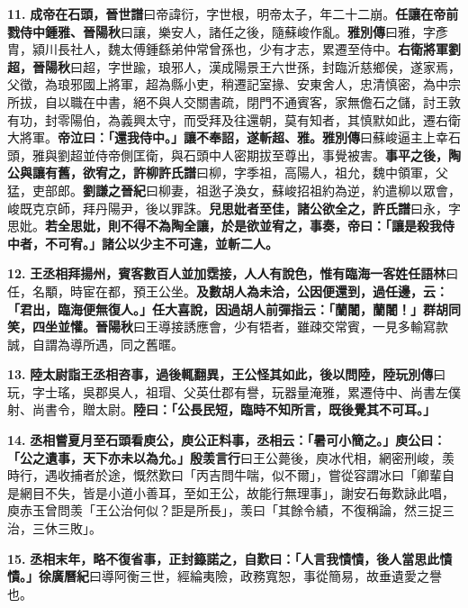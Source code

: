 \textbf{11.} \textbf{成帝在石頭，}{\footnotesize \textbf{晉世譜}曰帝諱衍，字世根，明帝太子，年二十二崩。}\textbf{任讓在帝前戮侍中鍾雅、}{\footnotesize \textbf{晉陽秋}曰讓，樂安人，諸任之後，隨蘇峻作亂。\textbf{雅別傳}曰雅，字彥胄，潁川長社人，魏太傅鍾繇弟仲常曾孫也，少有才志，累遷至侍中。}\textbf{右衛將軍劉超，}{\footnotesize \textbf{晉陽秋}曰超，字世踰，琅邪人，漢成陽景王六世孫，封臨沂慈鄉侯，遂家焉，父徵，為琅邪國上將軍，超為縣小吏，稍遷記室掾、安東舍人，忠清慎密，為中宗所拔，自以職在中書，絕不與人交關書疏，閉門不通賓客，家無儋石之儲，討王敦有功，封零陽伯，為義興太守，而受拜及往還朝，莫有知者，其慎默如此，遷右衛大將軍。}\textbf{帝泣曰：「還我侍中。」讓不奉詔，遂斬超、雅。}{\footnotesize \textbf{雅別傳}曰蘇峻逼主上幸石頭，雅與劉超並侍帝側匡衛，與石頭中人密期拔至尊出，事覺被害。}\textbf{事平之後，陶公與讓有舊，欲宥之，許柳}{\footnotesize \textbf{許氏譜}曰柳，字季祖，高陽人，祖允，魏中領軍，父猛，吏部郎。\textbf{劉謙之晉紀}曰柳妻，祖逖子渙女，蘇峻招祖約為逆，約遣柳以眾會，峻既克京師，拜丹陽尹，後以罪誅。}\textbf{兒思妣者至佳，諸公欲全之，}{\footnotesize \textbf{許氏譜}曰永，字思妣。}\textbf{若全思妣，則不得不為陶全讓，於是欲並宥之，事奏，帝曰：「讓是殺我侍中者，不可宥。」諸公以少主不可違，並斬二人。}

\textbf{12.} \textbf{王丞相拜揚州，賓客數百人並加霑接，人人有說色，惟有臨海一客姓任}{\footnotesize \textbf{語林}曰任，名顒，時宦在都，預王公坐。}\textbf{及數胡人為未洽，公因便還到，過任邊，云：「君出，臨海便無復人。」任大喜說，因過胡人前彈指云：「蘭闍，蘭闍！」群胡同笑，四坐並懽。}{\footnotesize \textbf{晉陽秋}曰王導接誘應會，少有牾者，雖疎交常賓，一見多輸寫款誠，自謂為導所遇，同之舊暱。}

\textbf{13.} \textbf{陸太尉詣王丞相咨事，過後輒翻異，王公怪其如此，後以問陸，}{\footnotesize \textbf{陸玩別傳}曰玩，字士瑤，吳郡吳人，祖瑁、父英仕郡有譽，玩器量淹雅，累遷侍中、尚書左僕射、尚書令，贈太尉。}\textbf{陸曰：「公長民短，臨時不知所言，既後覺其不可耳。」}

\textbf{14.} \textbf{丞相嘗夏月至石頭看庾公，庾公正料事，丞相云：「暑可小簡之。」庾公曰：「公之遺事，天下亦未以為允。」}{\footnotesize \textbf{殷羡言行}曰王公薨後，庾冰代相，網密刑峻，羡時行，遇收捕者於途，慨然歎曰「丙吉問牛喘，似不爾」，嘗從容謂冰曰「卿輩自是網目不失，皆是小道小善耳，至如王公，故能行無理事」，謝安石毎歎詠此唱，庾赤玉曾問羡「王公治何似？詎是所長」，羡曰「其餘令績，不復稱論，然三捉三治，三休三敗」。}

\textbf{15.} \textbf{丞相末年，略不復省事，正封籙諾之，自歎曰：「人言我憒憒，後人當思此憒憒。」}{\footnotesize \textbf{徐廣曆紀}曰導阿衡三世，經綸夷險，政務寬恕，事從簡易，故垂遺愛之譽也。}


